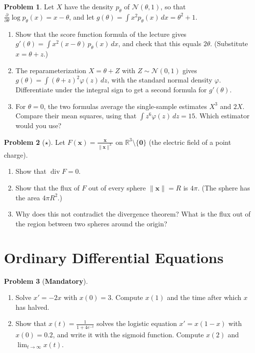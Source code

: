 \documentclass[11pt]{article}
\theoremstyle{definition}
\newtheorem{problem}{Problem}[section]
\newcommand{\mandatory}{\textcolor{red!70!black}{\textbf{Mandatory}}}
\newcommand{\norm}[1]{\lVert #1 \rVert}
\DeclareMathOperator{\Div}{div}
\begin{document}
\begin{problem}\label{pr:score-function}
    Let $X$ have the density $p_\theta$ of $\mathcal{N}(\theta, 1)$, so that $\frac{\partial}{\partial\theta}\log p_\theta(x) = x - \theta$, and let $g(\theta) = \int x^2p_\theta(x)\, dx = \theta^2 + 1$.
    \begin{enumerate}[label=(\alph*)]
        \item Show that the score function formula of the lecture gives $g'(\theta) = \int x^2(x - \theta)\,p_\theta(x)\, dx$, and check that this equals $2\theta$. (Substitute $x = \theta + z$.)
        \item The reparameterization $X = \theta + Z$ with $Z \sim \mathcal{N}(0, 1)$ gives $g(\theta) = \int (\theta + z)^2\varphi(z)\, dz$, with the standard normal density $\varphi$. Differentiate under the integral sign to get a second formula for $g'(\theta)$.
        \item For $\theta = 0$, the two formulas average the single-sample estimates $X^3$ and $2X$. Compare their mean squares, using that $\int z^6\varphi(z)\, dz = 15$. Which estimator would you use?
    \end{enumerate}
\end{problem}

\begin{problem}[$\star$]\label{pr:coulomb}
    Let $F(\mathbf{x}) = \frac{\mathbf{x}}{\norm{\mathbf{x}}^3}$ on $\mathbb{R}^3 \setminus \{\mathbf{0}\}$ (the electric field of a point charge).
    \begin{enumerate}[label=(\alph*)]
        \item Show that $\Div F = 0$.
        \item Show that the flux of $F$ out of every sphere $\norm{\mathbf{x}} = R$ is $4\pi$. (The sphere has the area $4\pi R^2$.)
        \item Why does this not contradict the divergence theorem? What is the flux out of the region between two spheres around the origin?
    \end{enumerate}
\end{problem}

\section{Ordinary Differential Equations}

\begin{problem}[\mandatory]\label{pr:scalar-ode}
    \begin{enumerate}[label=(\alph*)]
        \item Solve $x' = -2x$ with $x(0) = 3$. Compute $x(1)$ and the time after which $x$ has halved.
        \item Show that $x(t) = \frac{1}{1 + 4e^{-t}}$ solves the logistic equation $x' = x(1 - x)$ with $x(0) = 0.2$, and write it with the sigmoid function. Compute $x(2)$ and $\lim_{t \to \infty} x(t)$.
    \end{enumerate}
\end{problem}
\end{document}
